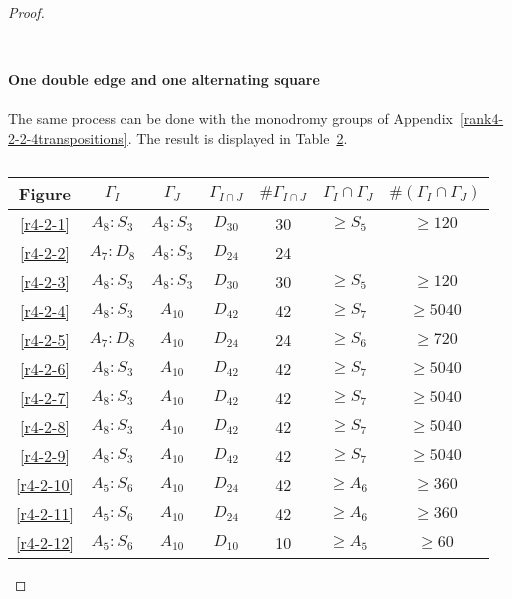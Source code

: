 \begin{proof}
\begin{table}[h]
\begin{tabular}{|c|c|c|c|c|c|c|}
  \end{tabular}
  \caption{}
  \label{results-2-1}
\end{table}

\paragraph{}
\textbf{One double edge and one alternating square}

  \paragraph{}
  The same process can be done with the monodromy groups of Appendix~\ref{rank4-2-2-4transpositions}. The result is displayed in Table~\ref{results-2-2}.

  \begin{table}
    \centering
    \begin{tabular}{|c|c|c|c|c|c|c|}
      \hline
      Figure & $\Gamma_{I}$ & $\Gamma_{J}$ & $\Gamma_{I \cap J}$ & $\#\Gamma_{I \cap J}$ & $\Gamma_{I} \cap \Gamma_{J}$ & $\#(\Gamma_{I} \cap \Gamma_{J})$ \\ \hline

      \ref{r4-2-1} & $A_8 : S_3$ & $A_8 : S_3 $ & $D_{30}$ & 30 & $\ge S_5$ & $\ge 120$ \\ \hline
      \ref{r4-2-2} & $A_7 : D_8$ & $A_8 : S_3$ & $D_{24}$ & 24 & & \\ \hline
      \ref{r4-2-3} & $A_8 : S_3$ & $A_8 : S_3 $ & $D_{30}$ & 30 & $\ge S_5$ & $\ge 120$ \\ \hline
      \ref{r4-2-4} & $A_8 : S_3$ & $A_{10}$ & $D_{42}$ & 42 & $\ge S_7$ & $\ge 5040$ \\ \hline
      \ref{r4-2-5} & $A_7 : D_8$ & $A_{10}$ & $D_{24}$ & 24 & $\ge S_6$ & $\ge 720$ \\ \hline
      \ref{r4-2-6} & $A_8 : S_3$ & $A_{10}$ & $D_{42}$ & 42 & $\ge S_7$ & $\ge 5040$ \\ \hline
      \ref{r4-2-7} & $A_8 : S_3$ & $A_{10}$ & $D_{42}$ & 42 & $\ge S_7$ & $\ge 5040$ \\ \hline
      \ref{r4-2-8} & $A_8 : S_3$ & $A_{10}$ & $D_{42}$ & 42 & $\ge S_7$ & $\ge 5040$ \\ \hline
      \ref{r4-2-9} & $A_8 : S_3$ & $A_{10}$ & $D_{42}$ & 42 & $\ge S_7$ & $\ge 5040$ \\ \hline
      \ref{r4-2-10} & $A_5 : S_6$ & $A_{10}$ & $D_{24}$ & 42 & $\ge A_6$ & $\ge 360$ \\ \hline
      \ref{r4-2-11} & $A_5 : S_6$ & $A_{10}$ & $D_{24}$ & 42 & $\ge A_6$ & $\ge 360$ \\ \hline
      \ref{r4-2-12} & $A_5 : S_6$ & $A_{10}$ & $D_{10}$ & 10 & $\ge A_5$ & $\ge 60$ \\ \hline
        \end{tabular}
    \caption{}
    \label{results-2-2}
  \end{table}


\end{proof}
